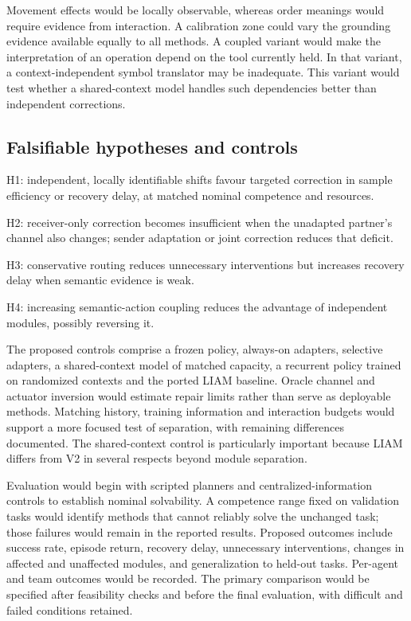 \documentclass[10pt,a4paper]{article}
\begin{document}
Movement effects would be locally observable, whereas order meanings would require evidence from interaction. A calibration zone could vary the grounding evidence available equally to all methods. A coupled variant would make the interpretation of an operation depend on the tool currently held. In that variant, a context-independent symbol translator may be inadequate. This variant would test whether a shared-context model handles such dependencies better than independent corrections.

\subsection{Falsifiable hypotheses and controls}

\par\noindent H1: independent, locally identifiable shifts favour targeted correction in sample efficiency or recovery delay, at matched nominal competence and resources.
\par\noindent H2: receiver-only correction becomes insufficient when the unadapted partner's channel also changes; sender adaptation or joint correction reduces that deficit.
\par\noindent H3: conservative routing reduces unnecessary interventions but increases recovery delay when semantic evidence is weak.
\par\noindent H4: increasing semantic-action coupling reduces the advantage of independent modules, possibly reversing it.

The proposed controls comprise a frozen policy, always-on adapters, selective adapters, a shared-context model of matched capacity, a recurrent policy trained on randomized contexts and the ported LIAM baseline. Oracle channel and actuator inversion would estimate repair limits rather than serve as deployable methods. Matching history, training information and interaction budgets would support a more focused test of separation, with remaining differences documented. The shared-context control is particularly important because LIAM differs from V2 in several respects beyond module separation.

Evaluation would begin with scripted planners and centralized-information controls to establish nominal solvability. A competence range fixed on validation tasks would identify methods that cannot reliably solve the unchanged task; those failures would remain in the reported results. Proposed outcomes include success rate, episode return, recovery delay, unnecessary interventions, changes in affected and unaffected modules, and generalization to held-out tasks. Per-agent and team outcomes would be recorded. The primary comparison would be specified after feasibility checks and before the final evaluation, with difficult and failed conditions retained.
\end{document}
